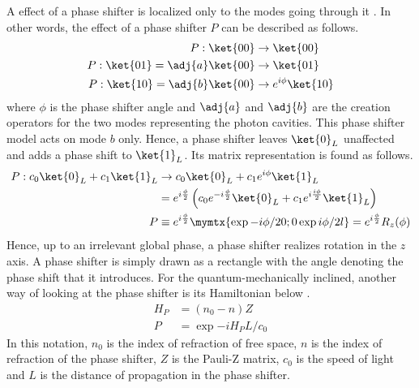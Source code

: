 A effect of a phase shifter is localized only to the modes going through it \cite{klm}. In other words, the effect of a phase shifter $P$ can be described as follows.
\begin{align}
P:\ket{00} &\rightarrow \ket{00}\\
P:\ket{01} = \adj{a}\ket{00} &\rightarrow \ket{01}\\
P:\ket{10} = \adj{b}\ket{00} &\rightarrow e^{i\phi}\ket{10}
\end{align}
where $\phi$ is the phase shifter angle and $\adj{a}$ and $\adj{b}$ are the creation operators for the two modes representing the photon cavities. This phase shifter model acts on mode $b$ only. Hence, a phase shifter leaves $\ket{0}_L$ unaffected and adds a phase shift to $\ket{1}_L$. Its matrix representation is found as follows.
\begin{align}
P:c_0\ket{0}_L + c_1\ket{1}_L &\rightarrow c_0\ket{0}_L + c_1e^{i\phi}\ket{1}_L \\
&= e^{i\frac{\phi}{2}}\left(c_0e^{-i\frac{\phi}{2}}\ket{0}_L + c_1e^{i\frac{i\phi}{2}}\ket{1}_L\right)\\
P &\equiv e^{i\frac{\phi}{2}}\mymtx{\exp{-i\phi/2} 0;0 \exp{i\phi/2}l} = e^{i\frac{\phi}{2}}R_z(\phi)
\end{align}
Hence, up to an irrelevant global phase, a phase shifter realizes rotation in the $z$ axis. A phase shifter is simply drawn as a rectangle with the angle denoting the phase shift that it introduces. For the quantum-mechanically inclined, another way of looking at the phase shifter is its Hamiltonian  below \cite{nielsen2000}.
\begin{align}
H_P &= (n_0 - n)Z\\
P &= \exp{-iH_PL/c_0}
\end{align}
In this notation, $n_0$ is the index of refraction of free space, $n$ is the index of refraction of the phase shifter, $Z$ is the Pauli-Z matrix, $c_0$ is the speed of light and $L$ is the distance of propagation in the phase shifter.

